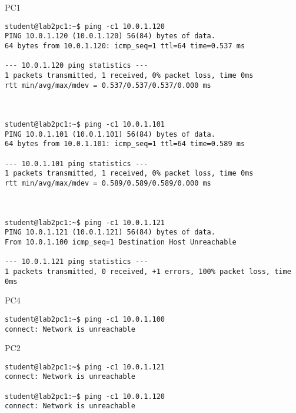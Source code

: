 \newpage
PC1
\begin{lstlisting}
student@lab2pc1:~$ ping -c1 10.0.1.120
PING 10.0.1.120 (10.0.1.120) 56(84) bytes of data.
64 bytes from 10.0.1.120: icmp_seq=1 ttl=64 time=0.537 ms

--- 10.0.1.120 ping statistics ---
1 packets transmitted, 1 received, 0% packet loss, time 0ms
rtt min/avg/max/mdev = 0.537/0.537/0.537/0.000 ms



student@lab2pc1:~$ ping -c1 10.0.1.101
PING 10.0.1.101 (10.0.1.101) 56(84) bytes of data.
64 bytes from 10.0.1.101: icmp_seq=1 ttl=64 time=0.589 ms

--- 10.0.1.101 ping statistics ---
1 packets transmitted, 1 received, 0% packet loss, time 0ms
rtt min/avg/max/mdev = 0.589/0.589/0.589/0.000 ms



student@lab2pc1:~$ ping -c1 10.0.1.121
PING 10.0.1.121 (10.0.1.121) 56(84) bytes of data.
From 10.0.1.100 icmp_seq=1 Destination Host Unreachable

--- 10.0.1.121 ping statistics ---
1 packets transmitted, 0 received, +1 errors, 100% packet loss, time 0ms
\end{lstlisting}

PC4
\begin{lstlisting}
student@lab2pc1:~$ ping -c1 10.0.1.100
connect: Network is unreachable
\end{lstlisting}

PC2
\begin{lstlisting}
student@lab2pc1:~$ ping -c1 10.0.1.121
connect: Network is unreachable

student@lab2pc1:~$ ping -c1 10.0.1.120
connect: Network is unreachable
\end{lstlisting}

